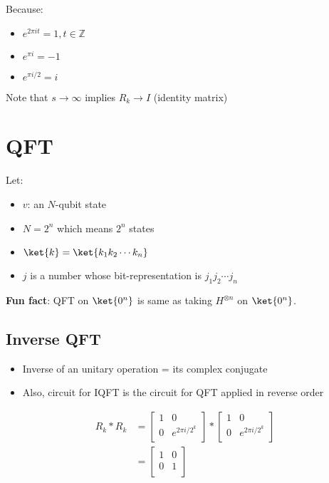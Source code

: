 \documentclass[12pt]{article}
\begin{document}
Because:
\begin{itemize}
\item $e^{2\pi i t} = 1, t \in \mathbb{Z}$
\item $e^{\pi i} = -1$
\item $e^{\pi i/2} = i$
\end{itemize}

Note that $s \to \infty$ implies $R_k \to I$ (identity matrix)

\section{QFT}
Let:
\begin{itemize}
\item $v$: an $N$-qubit state
\item $N = 2^n$ which means $2^n$ states
\item $\ket{k} = \ket{k_1 k_2 \cdots k_n}$
\item $j$ is a number whose bit-representation is $j_1 j_2 \cdots j_n$
\end{itemize}

\textbf{Fun fact}: QFT on $\ket{0^n}$ is same as taking $H^{\otimes n}$ on $\ket{0^n}$.

\subsection{Inverse QFT}
\begin{itemize}
\item Inverse of an unitary operation = its complex conjugate
\item Also, circuit for IQFT is the circuit for QFT applied in reverse order
\end{itemize}

\begin{align*}
  R_k * R_k &=
  \begin{bmatrix}
    1 & 0 \\
    0 & e^{2\pi i / 2^k} \\
  \end{bmatrix} *
  \begin{bmatrix}
    1 & 0 \\
    0 & e^{2\pi i / 2^k} \\
  \end{bmatrix} \\
  &=
  \begin{bmatrix}
    1 & 0 \\
    0 & 1 \\
  \end{bmatrix} \\
\end{align*}
\end{document}
